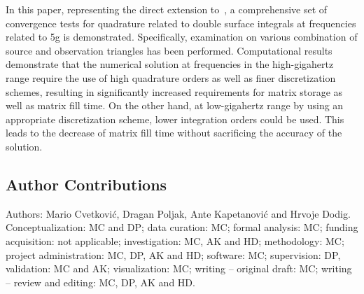 In this paper, representing the direct extension to~\cite{Cvetkovic2021Study}, a comprehensive set of convergence tests for quadrature related to double surface integrals at frequencies related to \gls{5g} is demonstrated.
Specifically, examination on various combination of source and observation triangles has been performed.
Computational results demonstrate that the numerical solution at frequencies in the high-gigahertz range require the use of high quadrature orders as well as finer discretization schemes, resulting in significantly increased requirements for matrix storage as well as matrix fill time.
On the other hand, at low-gigahertz range by using an appropriate discretization scheme, lower integration orders could be used.
This leads to the decrease of matrix fill time without sacrificing the accuracy of the solution.

\subsection{Author Contributions}
Authors: Mario Cvetković, Dragan Poljak, Ante Kapetanović and Hrvoje Dodig.\\
Conceptualization: MC and DP; data curation: MC; formal analysis: MC; funding acquisition: not applicable; investigation: MC, AK and HD; methodology: MC; project administration: MC, DP, AK and HD; software: MC; supervision: DP, validation: MC and AK; visualization: MC; writing -- original draft: MC; writing -- review and editing: MC, DP, AK and HD.
